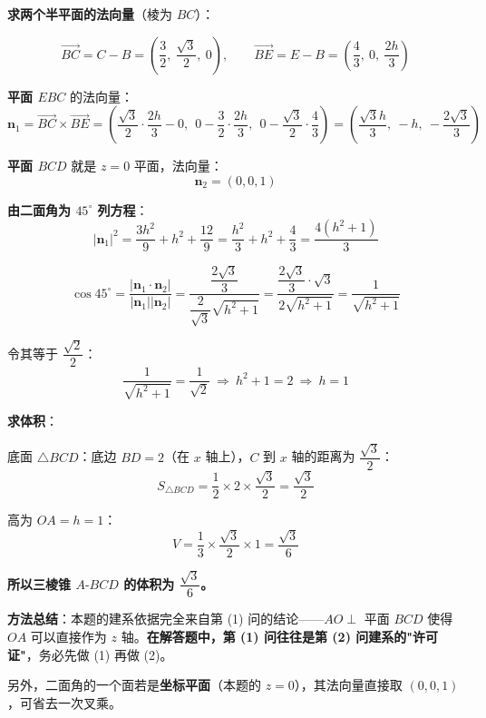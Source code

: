 \begin{answer}
\textbf{求两个半平面的法向量}（棱为 $BC$）：

\nopagebreak[4]
\[\overrightarrow{BC}=C-B=\left(\frac32,\ \frac{\sqrt3}2,\ 0\right),\qquad \overrightarrow{BE}=E-B=\left(\frac43,\ 0,\ \frac{2h}3\right)\]

\textbf{平面 $EBC$} 的法向量：
\nopagebreak[4]
\[\boldsymbol n_1=\overrightarrow{BC}\times\overrightarrow{BE}=\left(\frac{\sqrt3}2\cdot\frac{2h}3-0,\ \ 0-\frac32\cdot\frac{2h}3,\ \ 0-\frac{\sqrt3}2\cdot\frac43\right)=\left(\frac{\sqrt3h}3,\ -h,\ -\frac{2\sqrt3}3\right)\]

\textbf{平面 $BCD$} 就是 $z=0$ 平面，法向量：
\nopagebreak[4]
\[\boldsymbol n_2=(0,0,1)\]

\textbf{由二面角为 $45^\circ$ 列方程}：
\nopagebreak[4]
\[\left|\boldsymbol n_1\right|^{2}=\frac{3h^{2}}9+h^{2}+\frac{12}9=\frac{h^{2}}3+h^{2}+\frac43=\frac{4\left(h^{2}+1\right)}3\]

\nopagebreak[4]
\[\cos45^\circ=\frac{\left|\boldsymbol n_1\cdot\boldsymbol n_2\right|}{\left|\boldsymbol n_1\right|\left|\boldsymbol n_2\right|}=\frac{\dfrac{2\sqrt3}3}{\dfrac2{\sqrt3}\sqrt{h^{2}+1}}=\frac{\dfrac{2\sqrt3}3\cdot\sqrt3}{2\sqrt{h^{2}+1}}=\frac{1}{\sqrt{h^{2}+1}}\]

令其等于 $\dfrac{\sqrt2}2$：
\nopagebreak[4]
\[\frac1{\sqrt{h^{2}+1}}=\frac1{\sqrt2}\ \Longrightarrow\ h^{2}+1=2\ \Longrightarrow\ h=1\]

\textbf{求体积}：

底面 $\triangle BCD$：底边 $BD=2$（在 $x$ 轴上），$C$ 到 $x$ 轴的距离为 $\dfrac{\sqrt3}2$：
\nopagebreak[4]
\[S_{\triangle BCD}=\frac12\times2\times\frac{\sqrt3}2=\frac{\sqrt3}2\]

高为 $OA=h=1$：
\nopagebreak[4]
\[V=\frac13\times\frac{\sqrt3}2\times1=\frac{\sqrt3}6\]

\textbf{所以三棱锥 $A\text{-}BCD$ 的体积为 $\dfrac{\sqrt3}6$。}

\begin{gktip}
\textbf{方法总结}：本题的建系依据完全来自第 (1) 问的结论——$AO\perp$ 平面 $BCD$ 使得 $OA$ 可以直接作为 $z$ 轴。\textbf{在解答题中，第 (1) 问往往是第 (2) 问建系的"许可证"}，务必先做 (1) 再做 (2)。

另外，二面角的一个面若是\textbf{坐标平面}（本题的 $z=0$），其法向量直接取 $(0,0,1)$，可省去一次叉乘。
\end{gktip}



\par\medskip

\end{answer}
